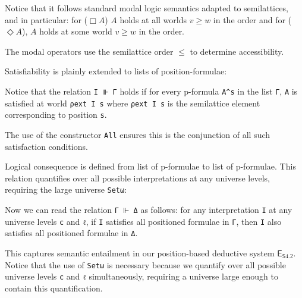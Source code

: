 \documentclass{article}
\newcommand{\logic}{\mathsf{S4.2}}
\newcommand{\calculus}{\mathsf{E}_{\logic}}
\newcommand{\commento}[1]{}
\theoremstyle{definition}
\begin{document}
{{Notice that it follows standard modal logic semantics adapted to semilattices, and in particular: for ($\Box A$) $A$ holds at all worlds $v \geq w$ in the order and for ($\Diamond A$), $A$ holds at some world $v \geq w$ in the order.
\commento{\begin{itemize}
\item \textbf{Propositions}: True if the valuation function returns true
\item \textbf{Implication}: Standard logical implication
\item \textbf{Conjunction/Disjunction}: Product and sum types respectively
\item \textbf{Negation}: Satisfaction implies falsehood
\item \textbf{Necessity} ($\Box A$): $A$ holds at all worlds $v \geq w$ in the order
\item \textbf{Possibility} ($\Diamond A$): $A$ holds at some world $v \geq w$ in the order
\end{itemize}
}
The modal operators use the semilattice order $\leq$ to determine accessibility.


Satisfiability is plainly extended to lists of position-formulae:


Notice that the relation \texttt{I ⊪ Γ} holds if for every  p-formula \texttt{A\^{}s} in the list \texttt{Γ}, \texttt{A} is satisfied at world \texttt{ρext I s} where \texttt{ρext I s} is the semilattice element corresponding to position \texttt{s}.

The use of the constructor \texttt{All} ensures this is the conjunction of all such satisfaction conditions.

Logical consequence is defined from list of p-formulae to list of p-formulae. This relation quantifies over all possible interpretations at any universe levels, requiring the large universe \texttt{Setω}:





Now we can read the relation \texttt{Γ ⊩ Δ} as follows: for any interpretation \texttt{I} at any universe levels \texttt{c} and \texttt{ℓ}, if \texttt{I} satisfies all positioned formulae in \texttt{Γ}, then \texttt{I} also satisfies all positioned formulae in \texttt{Δ}.

This captures semantic entailment in our position-based deductive system $\calculus$. Notice that the use of \texttt{Setω} is necessary because we quantify over all possible universe levels \texttt{c} and \texttt{ℓ} simultaneously, requiring a universe large enough to contain this quantification.


}}
\end{document}
